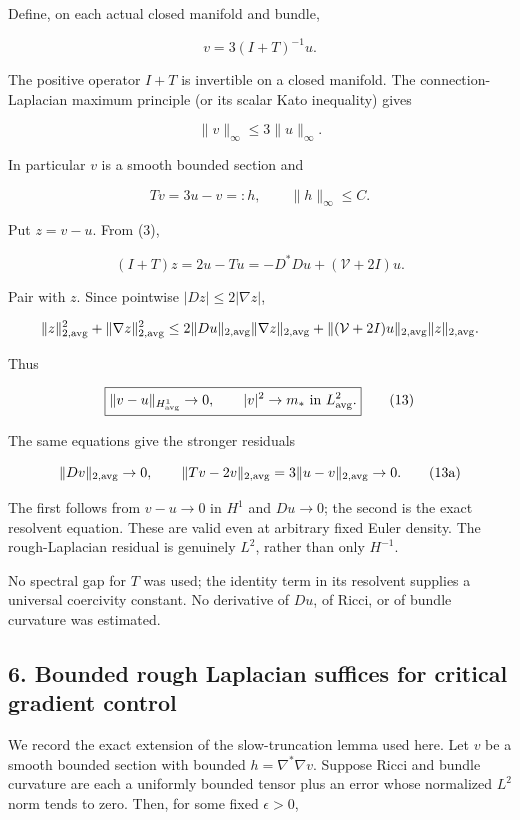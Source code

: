Define, on each actual closed manifold and bundle,

\[
 v=3(I+T)^{-1}u.
\tag{10}
\]

The positive operator \(I+T\) is invertible on a closed manifold. The
connection-Laplacian maximum principle (or its scalar Kato inequality)
gives

\[
 \|v\|_\infty\le3\|u\|_\infty.
\tag{11}
\]

In particular \(v\) is a smooth bounded section and

\[
 Tv=3u-v=:h,\qquad \|h\|_\infty\le C.
\tag{12}
\]

Put \(z=v-u\). From (3),

\[
 (I+T)z=2u-Tu=-D^*Du+(\mathcal V+2I)u.
\]

Pair with \(z\). Since pointwise \(|Dz|\le2|\nabla z|\),

\[
 \|z\|_{2,\rm avg}^2+\|\nabla z\|_{2,\rm avg}^2
 \le2\|Du\|_{2,\rm avg}\|\nabla z\|_{2,\rm avg}
 +\|(\mathcal V+2I)u\|_{2,\rm avg}\|z\|_{2,\rm avg}.
\]

Thus

\[
 \boxed{\|v-u\|_{H^1_{\rm avg}}\to0,\qquad
               |v|^2\to m_*\text{ in }L^2_{\rm avg}.}\tag{13}
\]

The same equations give the stronger residuals

\[
 \|Dv\|_{2,\rm avg}\to0,\qquad
 \|Tv-2v\|_{2,\rm avg}=3\|u-v\|_{2,\rm avg}\to0.\tag{13a}
\]

The first follows from \(v-u\to0\) in \(H^1\) and \(Du\to0\); the second
is the exact resolvent equation. These are valid even at arbitrary fixed
Euler density. The rough-Laplacian residual is genuinely \(L^2\), rather
than only \(H^{-1}\).

No spectral gap for \(T\) was used; the identity term in its resolvent
supplies a universal coercivity constant. No derivative of \(Du\), of
Ricci, or of bundle curvature was estimated.

\hypertarget{o10strength:bounded-rough-laplacian-suffices-for-critical-gradient-control}{%
\subsection{6. Bounded rough Laplacian suffices for critical gradient
control}\label{o10strength:bounded-rough-laplacian-suffices-for-critical-gradient-control}}

We record the exact extension of the slow-truncation lemma used here.
Let \(v\) be a smooth bounded section with bounded
\(h=\nabla^*\nabla v\). Suppose Ricci and bundle curvature are each a
uniformly bounded tensor plus an error whose normalized \(L^2\) norm
tends to zero. Then, for some fixed \(\epsilon>0\),

